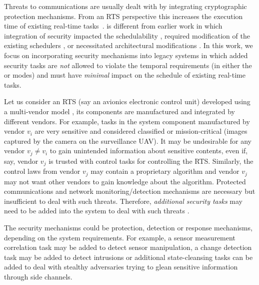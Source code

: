 \documentclass[../rt_server_main.tex]{subfiles}
\begin{document}
Threats to communications are usually dealt with by integrating cryptographic protection mechanisms. From an RTS perspective this increases the execution time of existing real-time tasks~\cite{xie2007improving, lin2009static}. %
\coolname is different from earlier work  in which integration of security impacted the schedulability \cite{sibin_RT_security_journal,sg1, sg2}, required modification of the existing schedulers \cite{xie2007improving, lin2009static}, or necessitated architectural modifications \cite{slack_cornell,securecore}. In this work, we focus on incorporating security mechanisms into legacy systems in which added security tasks are \textit{not} allowed to violate the temporal requirements (in either the \pve or \ave modes) and must have \textit{minimal} impact on the schedule of existing real-time tasks.


Let us consider an RTS (say an avionics electronic control unit) developed using a multi-vendor model \cite{sg2}, \viz  its components are manufactured and integrated by different vendors. For example, tasks in the system component manufactured by vendor $v_i$ are very sensitive and considered classified or mission-critical (\eg images captured by the camera on the surveillance UAV). It may be undesirable for any vendor $v_j \neq v_i$ to gain unintended information about sensitive contents, even if, say, vendor $v_j$ is trusted with control tasks for controlling the RTS. Similarly, the control laws from vendor $v_j$ may contain a proprietary algorithm and vendor $v_j$ may not want other vendors to gain knowledge about the algorithm. Protected communications and network monitoring/detection mechanisms are necessary but insufficient to deal with such threats. Therefore, \textit{additional security tasks} may need to be added into the system to deal with such threats \cite{sibin_deeply}. %

The security mechanisms could be protection, detection or response mechanisms, depending on the system requirements. For example, a sensor measurement correlation task may be added to detect sensor manipulation, a change detection task may be added to detect intrusions or additional state-cleansing tasks \cite{sg1, sg2, sibin_RT_security_journal} can be added to deal with stealthy adversaries trying to glean sensitive information through side channels.
\end{document}
